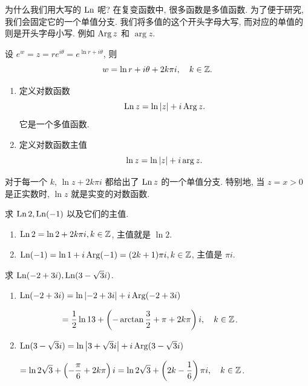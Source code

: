 \documentclass[nocolor,theme=doremi,lang=cn,11pt,chinese,twoside,openright,usesamecnt]{elegantbook}
\newenvironment{alertblock}[1]{\begin{tcolorbox}[alertstyle,title=#1]}{\end{tcolorbox}}
\begin{document}
为什么我们用大写的 $\operatorname{Ln}$ 呢? 
在复变函数中, 很多函数是多值函数.
为了便于研究, 我们会固定它的一个单值分支.
我们将多值的这个开头字母大写, 而对应的单值的则是开头字母小写.
例如 $\operatorname{Arg} z$ 和 $\arg z$.

设 $e^w=z=re^{i\theta}=e^{\ln r+i\theta}$,
则
\[w=\ln r+i\theta+2k\pi i,\quad k\in{\mathbb{Z}}.\]
\begin{alertblock}{对数函数}
	\begin{enumerate}
		\item 定义对数函数
			\[\operatorname{Ln} z=\ln\left|z\right|+i\operatorname{Arg} z.\]
			它是一个多值函数.
		\item 定义对数函数主值
			\[\ln z=\ln\left|z\right|+i\arg z.\]

	\end{enumerate}
\end{alertblock}

对于每一个 $k$, $\ln z+2k\pi i$ 都给出了 $\operatorname{Ln} z$ 的一个单值分支.
特别地, 当 $z=x>0$ 是正实数时, $\ln z$ 就是实变的对数函数.

\begin{example}
	求 $\operatorname{Ln} 2,\operatorname{Ln}(-1)$ 以及它们的主值.
\end{example}

\begin{solution}
	\begin{enumerate}
		\item $\operatorname{Ln}2=\ln2+2k\pi i, k\in{\mathbb{Z}}$,
		{主值就是 $\ln 2$.}
		\item $\operatorname{Ln}(-1)=\ln1+i\operatorname{Arg}(-1)=(2k+1)\pi i, k\in{\mathbb{Z}}$,
		{主值是 $\pi i$.}
	\end{enumerate}
\end{solution}

\begin{example}
求 $\operatorname{Ln}(-2+3i),\operatorname{Ln}(3-\sqrt3 i)$.
\end{example}

\begin{solution}
	\begin{enumerate}
		\item $\operatorname{Ln}(-2+3i)=\ln\left|-2+3i\right|+i\operatorname{Arg}(-2+3i)$

		{$\qquad\qquad\quad\displaystyle=\frac 12\ln 13+\left(-\arctan\frac 32+\pi+2k\pi\right)i,\quad k\in{\mathbb{Z}}$.}
		\item $\operatorname{Ln}(3-\sqrt3i)=\ln\left|3+\sqrt 3i\right|+i\operatorname{Arg}(3-\sqrt 3i)$

		{$\displaystyle=\ln 2\sqrt 3+\left(-\frac\pi6+2k\pi\right)i
		=\ln 2\sqrt 3+\left(2k-\frac16\right)\pi i,\quad k\in{\mathbb{Z}}$.}
	\end{enumerate}
\end{solution}
\end{document}
